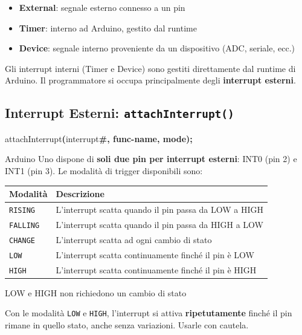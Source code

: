 \documentclass[
  italian,
  openany]{book}
\newenvironment{Shaded}{\begin{snugshade}}{\end{snugshade}}
\newcommand{\ErrorTok}[1]{\textcolor[rgb]{0.64,0.00,0.00}{\textbf{#1}}}
\newcommand{\NormalTok}[1]{#1}
\newcommand{\OperatorTok}[1]{\textcolor[rgb]{0.81,0.36,0.00}{\textbf{#1}}}
\newcounter{none} %
\providecommand{\tightlist}{%
  \setlength{\itemsep}{0pt}\setlength{\parskip}{0pt}}
\begin{document}
\begin{itemize}
\tightlist
\item
  \textbf{External}: segnale esterno connesso a un pin
\item
  \textbf{Timer}: interno ad Arduino, gestito dal runtime
\item
  \textbf{Device}: segnale interno proveniente da un dispositivo (ADC,
  seriale, ecc.)
\end{itemize}

Gli interrupt interni (Timer e Device) sono gestiti direttamente dal
runtime di Arduino. Il programmatore si occupa principalmente degli
\textbf{interrupt esterni}.

\subsection{\texorpdfstring{Interrupt Esterni:
\texttt{attachInterrupt()}}{Interrupt Esterni: attachInterrupt()}}\label{interrupt-esterni-attachinterrupt}

\begin{Shaded}
\begin{Highlighting}[]
\NormalTok{attachInterrupt}\OperatorTok{(}\NormalTok{interrupt}\ErrorTok{\#, func{-}name, mode);}
\end{Highlighting}
\end{Shaded}

Arduino Uno dispone di \textbf{soli due pin per interrupt esterni}: INT0
(pin 2) e INT1 (pin 3). Le modalità di trigger disponibili sono:

{\def\LTcaptype{none} %
\begin{longtable}[]{@{}ll@{}}
\toprule\noalign{}
Modalità & Descrizione \\
\midrule\noalign{}
\endhead
\bottomrule\noalign{}
\endlastfoot
\texttt{RISING} & L'interrupt scatta quando il pin passa da LOW a
HIGH \\
\texttt{FALLING} & L'interrupt scatta quando il pin passa da HIGH a
LOW \\
\texttt{CHANGE} & L'interrupt scatta ad ogni cambio di stato \\
\texttt{LOW} & L'interrupt scatta continuamente finché il pin è LOW \\
\texttt{HIGH} & L'interrupt scatta continuamente finché il pin è HIGH \\
\end{longtable}
}

\begin{calloutwarning}{LOW e HIGH non richiedono un cambio di stato}

Con le modalità \texttt{LOW} e \texttt{HIGH}, l'interrupt si attiva
\textbf{ripetutamente} finché il pin rimane in quello stato, anche senza
variazioni. Usarle con cautela.

\end{calloutwarning}
\end{document}
